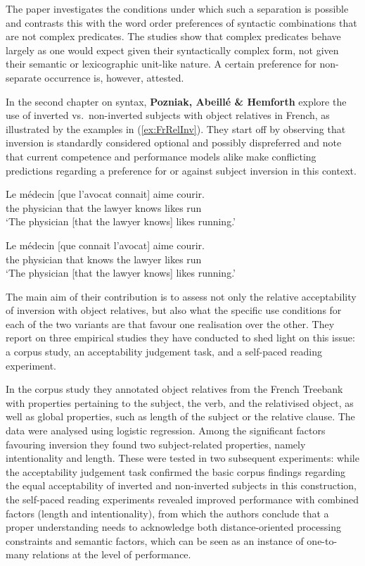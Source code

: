 \documentclass[output=paper]{langscibook}
\begin{document}
The paper investigates the conditions under which such a
separation is possible and contrasts this with the word order
preferences of syntactic combinations that are not complex
predicates. The studies show that complex predicates behave largely as
one would expect given their syntactically complex form, not given
their semantic or lexicographic unit-like nature. A certain preference
for non-separate occurrence is, however, attested.

In the second chapter on syntax, \textbf{Pozniak, Abeillé \& Hemforth}
explore the use of inverted vs.\ non-inverted subjects with object relatives in
French, as illustrated by the examples in (\ref{ex:FrRelInv}). They
start off by observing that inversion is standardly considered
optional and possibly dispreferred and note that current competence
and performance models alike make conflicting predictions regarding a
preference for or against subject inversion in this context.

\begin{exe}
  \ex \label{ex:FrRelInv}
  \begin{xlist}
    \ex \gll Le médecin [que l'avocat connait] aime courir.\\
    the physician that {the lawyer} knows likes run\\
    \glt `The physician [that the lawyer knows] likes running.'

    \ex
    \gll Le médecin [que connait l'avocat] aime courir.\\
    the physician that knows {the lawyer}  likes run\\
    \glt `The physician [that the lawyer knows] likes running.'
  \end{xlist}
\end{exe}


The main aim of their contribution is to assess not only the relative
acceptability of inversion with object relatives, but also what the
specific use conditions for each of the two variants are that favour
one realisation over the other. They report on three empirical studies
they have conducted to shed light on this issue: a corpus study, an
acceptability judgement task, and a self-paced reading experiment.


In the corpus study they annotated object relatives from the French
Treebank with properties pertaining to the subject, the verb, and the
relativised object, as well as global properties, such as length of
the subject or the relative clause. The data were analysed using
logistic regression. Among the significant factors favouring inversion
they found two subject-related properties, namely intentionality and
length. These were tested in two subsequent experiments: while the
acceptability judgement task confirmed the basic corpus findings regarding
the equal acceptability of inverted and non-inverted subjects in this
construction, the self-paced reading experiments revealed improved
performance with combined factors (length and intentionality), from
which the authors conclude that a proper understanding needs to
acknowledge both distance-oriented processing constraints and semantic
factors, which can be seen as an instance of one-to-many relations at the
level of performance.
\end{document}
